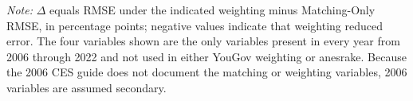 \begin{table}[!htbp]
{\begin{threeparttable}
\begin{tabular}{lcccccccccc}
\bottomrule
\end{tabular}
\begin{tablenotes}
\footnotesize
\item \textit{Note:} $\Delta$ equals RMSE under the indicated weighting minus Matching-Only RMSE, in percentage points; negative values indicate that weighting reduced error. The four variables shown are the only variables present in every year from 2006 through 2022 and not used in either YouGov weighting or anesrake. Because the 2006 CES guide does not document the matching or weighting variables, 2006 variables are assumed secondary.
\end{tablenotes}
\end{threeparttable}%
}
\end{table}